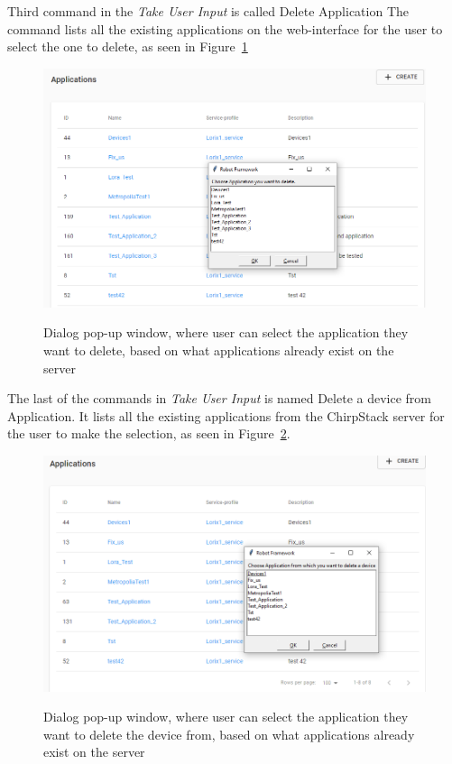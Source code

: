 Third command in the \textit{Take User Input} is called Delete Application
The command lists all the existing applications on the web-interface for the user to select the one to delete, as seen in Figure~\ref{fig:delete_application}

\begin{figure}[ht]
  \centering
  {\includegraphics[width=\textwidth]{illustration/delete_app_choose_app_dialog_with_applications_on_back.PNG}}
  \caption{Dialog pop-up window, where user can select the application they want to delete, based on what applications already exist on the server}
  \label{fig:delete_application}
\end{figure}

The last of the commands in \textit{Take User Input} is named Delete a device from Application.
It lists all the existing applications from the ChirpStack server for the user to make the selection, as seen in Figure~\ref{fig:delete_device_select_application}.

\clearpage

\begin{figure}[ht]
  \centering
  {\includegraphics[width=\textwidth]{illustration/delete_device_choose_app_dialog_with_applications_on_back.PNG}}
  \caption{Dialog pop-up window, where user can select the application they want to delete the device from, based on what applications already exist on the server}
  \label{fig:delete_device_select_application}
\end{figure}


